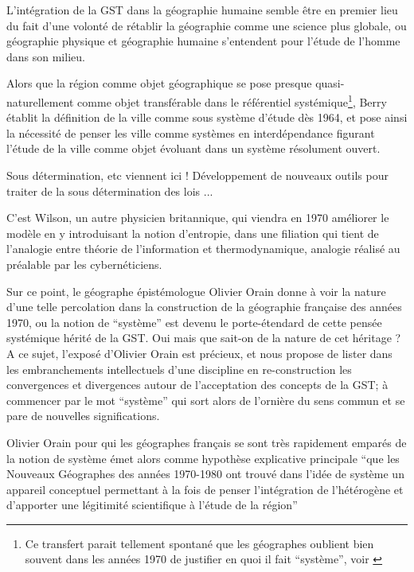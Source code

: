 L'intégration de la GST dans la géographie humaine semble être en premier lieu du fait d'une volonté de rétablir la géographie comme une science plus globale, ou géographie physique et géographie humaine s'entendent pour l'étude de l'homme dans son milieu.

Alors que la région comme objet géographique se pose presque quasi-naturellement comme objet transférable dans le référentiel systémique\footnote{ Ce transfert parait tellement spontané que les géographes oublient bien souvent dans les années 1970 de justifier en quoi il fait \enquote{système}, voir \autocite{Orain2001}}, Berry établit la définition de la ville comme sous système d'étude dès 1964, et pose ainsi la nécessité de penser les ville comme systèmes en interdépendance figurant l'étude de la ville comme objet évoluant dans un système résolument ouvert. 

Sous détermination, etc viennent ici !
Développement de nouveaux outils pour traiter de la sous détermination des lois ...


C'est Wilson, un autre physicien britannique, qui viendra en 1970 améliorer le modèle en y introduisant la notion d'entropie, dans une filiation qui tient de l'analogie entre théorie de l'information et thermodynamique, analogie réalisé au préalable par les cybernéticiens.


Sur ce point, le géographe épistémologue Olivier Orain \autocite{Orain2001} donne à voir la nature d'une telle percolation dans la construction de la géographie française des années 1970, ou la notion de \enquote{système} est devenu le porte-étendard de cette pensée systémique hérité de la GST. Oui mais que sait-on de la nature de cet héritage ? A ce sujet, l'exposé d'Olivier Orain est précieux, et nous propose de lister dans les embranchements intellectuels d'une discipline en re-construction les convergences et divergences autour de l'acceptation des concepts de la GST; à commencer par le mot \enquote{système} qui sort alors de l'ornière du sens commun et se pare de nouvelles significations.

Olivier Orain pour qui les géographes français se sont très rapidement emparés de la notion de système émet alors comme hypothèse explicative principale \enquote{que les Nouveaux Géographes des années 1970-1980 ont trouvé dans l’idée de système un appareil conceptuel permettant à la fois de penser l’intégration de l’hétérogène et d’apporter une légitimité scientifique à l’étude de la région} \autocite[23]{Orain2001} %

